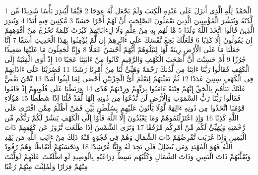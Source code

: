 \documentclass[20pt,a4paper]{article}
\title{}
\author{}
\date{}
\begin{document}
\pagecolor{cl_page}



{\tiny\colorbox{cl_aya}{1}} الْحَمْدُ لِلَّهِ الَّذِى أَنزَلَ عَلَى عَبْدِهِ الْكِتَبَ وَلَمْ يَجْعَل لَّهُ عِوَجَا
{\tiny\colorbox{cl_aya}{2}} قَيِّمًا لِّيُنذِرَ بَأْسًا شَدِيدًا مِّن لَّدُنْهُ وَيُبَشِّرَ الْمُؤْمِنِينَ الَّذِينَ يَعْمَلُونَ الصَّلِحَتِ أَنَّ لَهُمْ أَجْرًا حَسَنًا
{\tiny\colorbox{cl_aya}{3}} مَّكِثِينَ فِيهِ أَبَدًا
{\tiny\colorbox{cl_aya}{4}} وَيُنذِرَ الَّذِينَ قَالُوا اتَّخَذَ اللَّهُ وَلَدًا
{\tiny\colorbox{cl_aya}{5}} مَّا لَهُم بِهِ مِنْ عِلْمٍ وَلَا لِءَابَائِهِمْ كَبُرَتْ كَلِمَةً تَخْرُجُ مِنْ أَفْوَهِهِمْ إِن يَقُولُونَ إِلَّا كَذِبًا
{\tiny\colorbox{cl_aya}{6}} فَلَعَلَّكَ بَخِعٌ نَّفْسَكَ عَلَى ءَاثَرِهِمْ إِن لَّمْ يُؤْمِنُوا بِهَذَا الْحَدِيثِ أَسَفًا
{\tiny\colorbox{cl_aya}{7}} إِنَّا جَعَلْنَا مَا عَلَى الْأَرْضِ زِينَةً لَّهَا لِنَبْلُوَهُمْ أَيُّهُمْ أَحْسَنُ عَمَلًا
{\tiny\colorbox{cl_aya}{8}} وَإِنَّا لَجَعِلُونَ مَا عَلَيْهَا صَعِيدًا جُرُزًا
{\tiny\colorbox{cl_aya}{9}} أَمْ حَسِبْتَ أَنَّ أَصْحَبَ الْكَهْفِ وَالرَّقِيمِ كَانُوا مِنْ ءَايَتِنَا عَجَبًا
{\tiny\colorbox{cl_aya}{10}} إِذْ أَوَى الْفِتْيَةُ إِلَى الْكَهْفِ فَقَالُوا رَبَّنَا ءَاتِنَا مِن لَّدُنكَ رَحْمَةً وَهَيِّئْ لَنَا مِنْ أَمْرِنَا رَشَدًا
{\tiny\colorbox{cl_aya}{11}} فَضَرَبْنَا عَلَى ءَاذَانِهِمْ فِى الْكَهْفِ سِنِينَ عَدَدًا
{\tiny\colorbox{cl_aya}{12}} ثُمَّ بَعَثْنَهُمْ لِنَعْلَمَ أَىُّ الْحِزْبَيْنِ أَحْصَى لِمَا لَبِثُوا أَمَدًا
{\tiny\colorbox{cl_aya}{13}} نَّحْنُ نَقُصُّ عَلَيْكَ نَبَأَهُم بِالْحَقِّ إِنَّهُمْ فِتْيَةٌ ءَامَنُوا بِرَبِّهِمْ وَزِدْنَهُمْ هُدًى
{\tiny\colorbox{cl_aya}{14}} وَرَبَطْنَا عَلَى قُلُوبِهِمْ إِذْ قَامُوا فَقَالُوا رَبُّنَا رَبُّ السَّمَوَتِ وَالْأَرْضِ لَن نَّدْعُوَا مِن دُونِهِ إِلَهًا لَّقَدْ قُلْنَا إِذًا شَطَطًا
{\tiny\colorbox{cl_aya}{15}} هَؤُلَاءِ قَوْمُنَا اتَّخَذُوا مِن دُونِهِ ءَالِهَةً لَّوْلَا يَأْتُونَ عَلَيْهِم بِسُلْطَنٍ بَيِّنٍ فَمَنْ أَظْلَمُ مِمَّنِ افْتَرَى عَلَى اللَّهِ كَذِبًا
{\tiny\colorbox{cl_aya}{16}} وَإِذِ اعْتَزَلْتُمُوهُمْ وَمَا يَعْبُدُونَ إِلَّا اللَّهَ فَأْوُا إِلَى الْكَهْفِ يَنشُرْ لَكُمْ رَبُّكُم مِّن رَّحْمَتِهِ وَيُهَيِّئْ لَكُم مِّنْ أَمْرِكُم مِّرْفَقًا
{\tiny\colorbox{cl_aya}{17}} وَتَرَى الشَّمْسَ إِذَا طَلَعَت تَّزَوَرُ عَن كَهْفِهِمْ ذَاتَ الْيَمِينِ وَإِذَا غَرَبَت تَّقْرِضُهُمْ ذَاتَ الشِّمَالِ وَهُمْ فِى فَجْوَةٍ مِّنْهُ ذَلِكَ مِنْ ءَايَتِ اللَّهِ مَن يَهْدِ اللَّهُ فَهُوَ الْمُهْتَدِ وَمَن يُضْلِلْ فَلَن تَجِدَ لَهُ وَلِيًّا مُّرْشِدًا
{\tiny\colorbox{cl_aya}{18}} وَتَحْسَبُهُمْ أَيْقَاظًا وَهُمْ رُقُودٌ وَنُقَلِّبُهُمْ ذَاتَ الْيَمِينِ وَذَاتَ الشِّمَالِ وَكَلْبُهُم بَسِطٌ ذِرَاعَيْهِ بِالْوَصِيدِ لَوِ اطَّلَعْتَ عَلَيْهِمْ لَوَلَّيْتَ مِنْهُمْ فِرَارًا وَلَمُلِئْتَ مِنْهُمْ رُعْبًا
\end{document}
